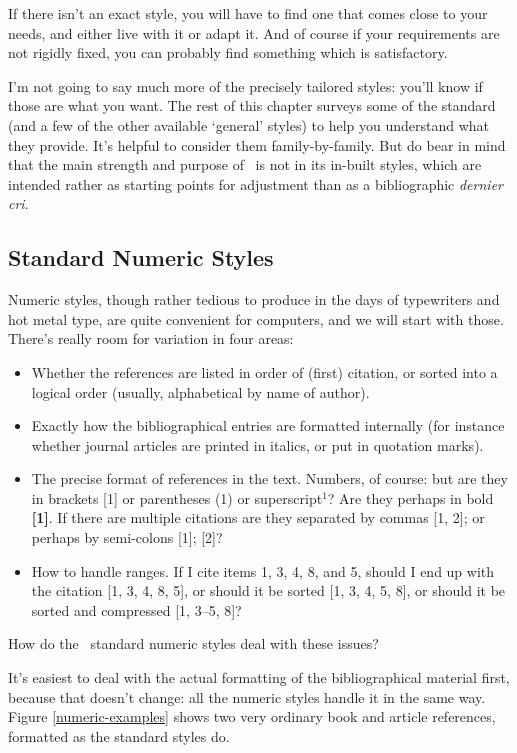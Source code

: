 If there isn't an exact style, you will have to find one that comes
close to your needs, and either live with it or adapt it. And of
course if your requirements are not rigidly fixed, you can probably
find something which is satisfactory.

I'm not going to say much more of the precisely tailored styles:
you'll know if those are what you want. The rest of this chapter
surveys some of the standard (and a few of the other available
`general' styles) to help you understand what they provide. It's
helpful to consider them family-by-family. But do bear in mind that
the main strength and purpose of \biblatex\ is not in its in-built
styles, which are intended rather as starting points for adjustment
than as a bibliographic \emph{dernier cri}.

\subsection{Standard Numeric Styles}

Numeric styles, though rather tedious to produce in the days of
typewriters and hot metal type, are quite convenient for computers,
and we will start with those. There's really room for variation in
four areas:
\begin{itemize}
\item Whether the references are listed in order of (first) citation,
  or sorted into a logical order (usually, alphabetical by name of
  author).
\item Exactly how the bibliographical entries are formatted internally
  (for instance whether journal articles are printed in italics, or
  put in quotation marks).
\item The precise format of references in the text. Numbers, of
  course: but are they in brackets [1] or parentheses (1) or
  superscript$^{1}$? Are they perhaps in bold \textbf{[1]}. If there
  are multiple citations are they separated by commas [1, 2]; or
  perhaps by semi-colons [1]; [2]?
\item How to handle ranges. If I cite items 1, 3, 4, 8, and 5, should
  I end up with the citation [1, 3, 4, 8, 5], or should it be sorted
  [1, 3, 4, 5, 8], or should it be sorted and compressed [1, 3--5, 8]?
\end{itemize}

How do the \biblatex\ standard numeric styles deal with these issues?

It's easiest to deal with the actual formatting of the bibliographical
material first, because that doesn't change: all the numeric styles handle it
in the same way. Figure \ref{numeric-examples} shows two very ordinary
book and article references, formatted as the standard styles do.

